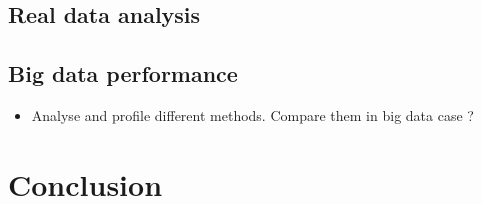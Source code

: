 \documentclass{article}
\begin{document}
\subsection{Real data analysis}
\label{sec:real-data}

\subsection{Big data performance}

\begin{itemize}
    \item Analyse and profile different methods. Compare them in big data case ?
\end{itemize}

\section{Conclusion}
\label{sec:6}




\end{document}

